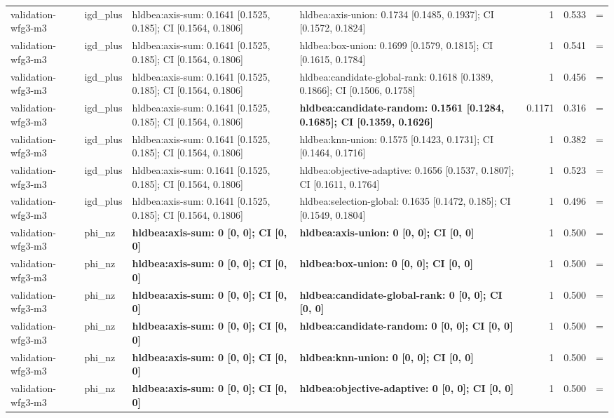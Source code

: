 \begin{tabular}{llllrrc}
validation-wfg3-m3 & igd\_plus & hldbea:axis-sum: 0.1641 [0.1525, 0.185]; CI [0.1564, 0.1806] & hldbea:axis-union: 0.1734 [0.1485, 0.1937]; CI [0.1572, 0.1824] & 1 & 0.533 & = \\
validation-wfg3-m3 & igd\_plus & hldbea:axis-sum: 0.1641 [0.1525, 0.185]; CI [0.1564, 0.1806] & hldbea:box-union: 0.1699 [0.1579, 0.1815]; CI [0.1615, 0.1784] & 1 & 0.541 & = \\
validation-wfg3-m3 & igd\_plus & hldbea:axis-sum: 0.1641 [0.1525, 0.185]; CI [0.1564, 0.1806] & hldbea:candidate-global-rank: 0.1618 [0.1389, 0.1866]; CI [0.1506, 0.1758] & 1 & 0.456 & = \\
validation-wfg3-m3 & igd\_plus & hldbea:axis-sum: 0.1641 [0.1525, 0.185]; CI [0.1564, 0.1806] & \textbf{hldbea:candidate-random: 0.1561 [0.1284, 0.1685]; CI [0.1359, 0.1626]} & 0.1171 & 0.316 & = \\
validation-wfg3-m3 & igd\_plus & hldbea:axis-sum: 0.1641 [0.1525, 0.185]; CI [0.1564, 0.1806] & hldbea:knn-union: 0.1575 [0.1423, 0.1731]; CI [0.1464, 0.1716] & 1 & 0.382 & = \\
validation-wfg3-m3 & igd\_plus & hldbea:axis-sum: 0.1641 [0.1525, 0.185]; CI [0.1564, 0.1806] & hldbea:objective-adaptive: 0.1656 [0.1537, 0.1807]; CI [0.1611, 0.1764] & 1 & 0.523 & = \\
validation-wfg3-m3 & igd\_plus & hldbea:axis-sum: 0.1641 [0.1525, 0.185]; CI [0.1564, 0.1806] & hldbea:selection-global: 0.1635 [0.1472, 0.185]; CI [0.1549, 0.1804] & 1 & 0.496 & = \\
validation-wfg3-m3 & phi\_nz & \textbf{hldbea:axis-sum: 0 [0, 0]; CI [0, 0]} & \textbf{hldbea:axis-union: 0 [0, 0]; CI [0, 0]} & 1 & 0.500 & = \\
validation-wfg3-m3 & phi\_nz & \textbf{hldbea:axis-sum: 0 [0, 0]; CI [0, 0]} & \textbf{hldbea:box-union: 0 [0, 0]; CI [0, 0]} & 1 & 0.500 & = \\
validation-wfg3-m3 & phi\_nz & \textbf{hldbea:axis-sum: 0 [0, 0]; CI [0, 0]} & \textbf{hldbea:candidate-global-rank: 0 [0, 0]; CI [0, 0]} & 1 & 0.500 & = \\
validation-wfg3-m3 & phi\_nz & \textbf{hldbea:axis-sum: 0 [0, 0]; CI [0, 0]} & \textbf{hldbea:candidate-random: 0 [0, 0]; CI [0, 0]} & 1 & 0.500 & = \\
validation-wfg3-m3 & phi\_nz & \textbf{hldbea:axis-sum: 0 [0, 0]; CI [0, 0]} & \textbf{hldbea:knn-union: 0 [0, 0]; CI [0, 0]} & 1 & 0.500 & = \\
validation-wfg3-m3 & phi\_nz & \textbf{hldbea:axis-sum: 0 [0, 0]; CI [0, 0]} & \textbf{hldbea:objective-adaptive: 0 [0, 0]; CI [0, 0]} & 1 & 0.500 & = \\

\end{tabular}
